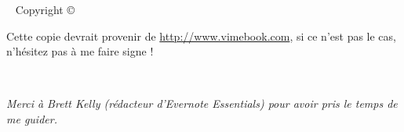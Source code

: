 



\frontmatter

\blankpage

\maketitle


\newpage
\begin{fullwidth}
~\vfill
\thispagestyle{empty}
\setlength{\parindent}{0pt}
\setlength{\parskip}{\baselineskip}
Copyright \copyright\ \the\year\ \thanklessauthor

\par{}

\par{}

\par Cette copie devrait provenir de \url{http://www.vimebook.com}, si ce n'est pas le cas, n'hésitez pas à me faire signe !

\end{fullwidth}

\tableofcontents

\listoffigures

\listoftables

\cleardoublepage
~\vfill
\begin{doublespace}
\noindent\fontsize{18}{22}\selectfont\itshape
\nohyphenation
Merci à Brett Kelly (rédacteur d'Evernote Essentials) pour avoir pris le temps de me guider.
\end{doublespace}
\vfill
\vfill

\cleardoublepage



\mainmatter









\printindex


